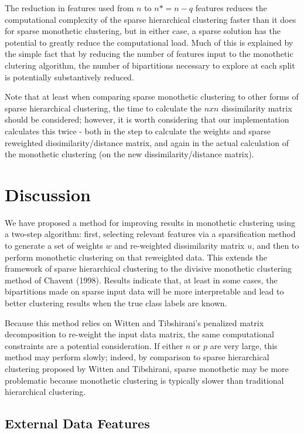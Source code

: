 \documentclass[
]{article}
\begin{document}
The reduction in features used from \(n\) to \(n* = n-q\) features
reduces the computational complexity of the sparse hierarchical
clustering faster than it does for sparse monothetic clustering, but in
either case, a sparse solution has the potential to greatly reduce the
computational load. Much of this is explained by the simple fact that by
reducing the number of features input to the monothetic clutering
algorithm, the number of bipartitions necessary to explore at each split
is potentially substantively reduced.

Note that at least when comparing sparse monothetic clustering to other
forms of sparse hierarchical clustering, the time to calculate the
\(nxn\) dissimilarity matrix should be considered; however, it is worth
considering that our implementation calculates this twice - both in the
step to calculate the weights and sparse reweighted
dissimilarity/distance matrix, and again in the actual calculation of
the monothetic clustering (on the new dissimilarity/distance matrix).

\hypertarget{discussion}{%
\section{Discussion}\label{discussion}}

We have proposed a method for improving results in monothetic clustering
using a two-step algorithm: first, selecting relevant features via a
sparsification method to generate a set of weights \(w\) and re-weighted
dissimilarity matrix \(u\), and then to perform monothetic clustering on
that reweighted data. This extends the framework of sparse hierarchical
clustering to the divisive monothetic clustering method of Chavent
(1998). Results indicate that, at least in some cases, the bipartitions
made on sparse input data will be more interpretable and lead to better
clustering results when the true class labels are known.

Because this method relies on Witten and Tibshirani's penalized matrix
decomposition to re-weight the input data matrix, the same computational
constraints are a potential consideration. If either \(n\) or \(p\) are
very large, this method may perform slowly; indeed, by comparison to
sparse hierarchical clustering proposed by Witten and Tibshirani, sparse
monothetic may be more problematic because monothetic clustering is
typically slower than traditional hierarchical clustering.

\hypertarget{external-data-features}{%
\subsection{External Data Features}\label{external-data-features}}
\end{document}
